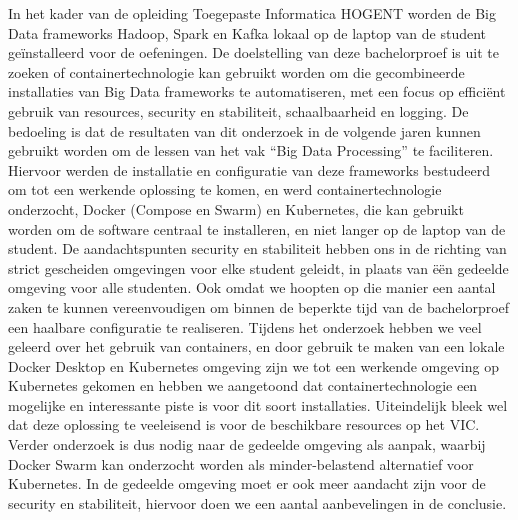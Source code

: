 In het kader van de opleiding Toegepaste Informatica HOGENT worden de Big Data frameworks Hadoop, Spark en Kafka lokaal op de laptop van de student geïnstalleerd voor de oefeningen.
De doelstelling van deze bachelorproef is uit te zoeken of containertechnologie kan gebruikt worden om die gecombineerde installaties van Big Data frameworks te automatiseren, met een focus op efficiënt gebruik van resources, security en stabiliteit, schaalbaarheid en logging. De bedoeling is dat de resultaten van dit onderzoek in de volgende jaren kunnen gebruikt worden om de lessen van het vak ``Big Data Processing'' te faciliteren.
\newline
Hiervoor werden de installatie en configuratie van deze frameworks bestudeerd om tot een werkende oplossing te komen, en werd containertechnologie onderzocht, Docker (Compose en Swarm) en Kubernetes, die kan gebruikt worden om de software centraal te installeren, en niet langer op de laptop van de student.
\newline
De aandachtspunten security en stabiliteit hebben ons in de richting van strict gescheiden omgevingen voor elke student geleidt, in plaats van ëën gedeelde omgeving voor alle studenten. Ook omdat we hoopten op die manier een aantal zaken te kunnen vereenvoudigen om binnen de beperkte tijd van de bachelorproef een haalbare configuratie te realiseren.
\newline
Tijdens het onderzoek hebben we veel geleerd over het gebruik van containers, en door gebruik te maken van een lokale Docker Desktop en Kubernetes omgeving zijn we tot een werkende omgeving op Kubernetes gekomen en hebben we aangetoond dat containertechnologie een mogelijke en interessante piste is voor dit soort installaties.
\newline
Uiteindelijk bleek wel dat deze oplossing te veeleisend is voor de beschikbare resources op het VIC. Verder onderzoek is dus nodig naar de gedeelde omgeving als aanpak, waarbij Docker Swarm kan onderzocht worden als minder-belastend alternatief voor Kubernetes. In de gedeelde omgeving moet er ook meer aandacht zijn voor de security en stabiliteit, hiervoor doen we een aantal aanbevelingen in de conclusie.
\newline
\newline
